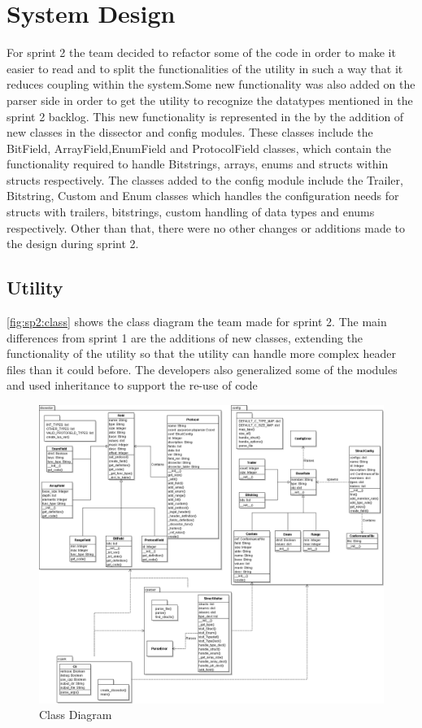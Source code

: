 \section{System Design}
For sprint 2 the team decided to refactor some of the code in order to make it easier to read and to split the functionalities of the utility in such a way that it reduces coupling within the system.Some new functionality was also added on the parser side in order to get the utility to recognize the datatypes mentioned in the sprint 2 backlog. This new functionality is represented in the by the addition of new classes in the dissector and config modules. These classes include the BitField, ArrayField,EnumField and ProtocolField classes, which contain the functionality required to handle Bitstrings, arrays, enums and structs within structs respectively. The classes added to the config module include the Trailer, Bitstring, Custom and Enum classes which handles the configuration needs for structs with trailers, bitstrings, custom handling of data types and enums respectively. Other than that, there were no other changes or additions made to the design during sprint 2.

\subsection{Utility}
\autoref{fig:sp2:class} shows the class diagram the team made for sprint 2. The main differences from sprint 1 are the additions of new classes, extending the functionality of the utility so that the utility can handle more complex header files than it could before. The developers also generalized some of the modules and used inheritance to support the re-use of code 
\begin{figure}[!htb]
	\center
	\includegraphics[width=\textwidth]{./sprints/img/class_diagram_s2}
	\caption{Class Diagram\label{fig:sp2:class}}
\end{figure}


